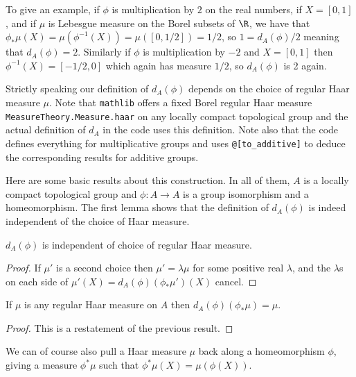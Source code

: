 To give an example, if $\phi$ is multiplication by $2$ on the real numbers,
if $X=[0,1]$, and if $\mu$ is Lebesgue measure on the Borel subsets of $\R$,
we have that $\phi_*\mu(X)=\mu(\phi^{-1}(X))=\mu([0,1/2])=1/2$,
so $1=d_A(\phi)/2$ meaning that $d_A(\phi)=2$. Similarly if $\phi$ is multiplication
by $-2$ and $X=[0,1]$ then $\phi^{-1}(X)=[-1/2,0]$ which again has measure $1/2$,
so $d_A(\phi)$ is 2 again.

Strictly speaking our definition of $d_A(\phi)$ depends on the choice of regular Haar
measure $\mu$. Note that {\tt mathlib} offers a fixed Borel regular Haar measure
{\tt MeasureTheory.Measure.haar} on any locally compact topological group
and the actual definition of $d_A$ in the code uses this definition.
Note also that the code defines everything for multiplicative groups
and uses {\tt @[to\_additive]} to deduce the corresponding results
for additive groups.

Here are some basic results about this construction. In all of them,
$A$ is a locally compact topological group and $\phi:A\to A$ is
a group isomorphism and a homeomorphism. The first lemma shows that
the definition of $d_A(\phi)$ is indeed independent of the choice of Haar measure.

\begin{lemma}
  \label{MeasureTheory.addEquivAddHaarChar_eq}
  \leanok
  $d_A(\phi)$ is independent of choice of regular Haar measure.
\end{lemma}
\begin{proof}
  \leanok
  If $\mu'$ is a second choice then $\mu'=\lambda\mu$ for some
  positive real $\lambda$, and the $\lambda$s on each side of
  $\mu'(X)=d_A(\phi)(\phi_*\mu')(X)$ cancel.
\end{proof}

\begin{lemma}
  \label{MeasureTheory.addEquivAddHaarChar_smul_map}
  \leanok
  If $\mu$ is any regular Haar measure on $A$ then
  $d_A(\phi)(\phi_*\mu) = \mu.$
\end{lemma}
\begin{proof}
  \leanok
  This is a restatement of the previous result.
\end{proof}

We can of course also pull a Haar measure $\mu$ back along a homeomorphism $\phi$,
giving a measure $\phi^*\mu$ such that $\phi^*\mu(X)=\mu(\phi(X))$.

